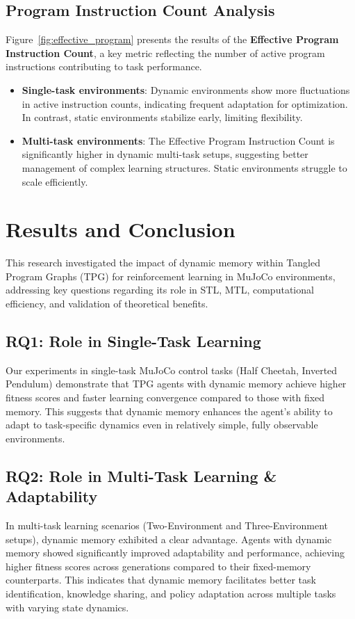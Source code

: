 \documentclass[sigconf]{acmart}
\begin{document}
\subsection{Program Instruction Count Analysis}
Figure~\ref{fig:effective_program} presents the results of the \textbf{Effective Program Instruction Count}, a key metric reflecting the number of active 
program instructions contributing to task performance.

\begin{itemize}
  \item \textbf{Single-task environments}: Dynamic environments show more fluctuations in active instruction counts, indicating frequent adaptation for optimization. In contrast, static environments stabilize early, limiting flexibility.
  \item \textbf{Multi-task environments}: The Effective Program Instruction Count is significantly higher in dynamic multi-task setups, suggesting better management of complex learning structures. Static environments struggle to scale efficiently.
\end{itemize}

  
  



\section{Results and Conclusion}

This research investigated the impact of dynamic memory within Tangled Program Graphs (TPG) for 
reinforcement learning in MuJoCo environments, addressing key questions regarding its role in 
STL, MTL, computational efficiency, and validation of theoretical benefits.

\subsection{RQ1: Role in Single-Task Learning} 
Our experiments in single-task MuJoCo control tasks (Half Cheetah, Inverted Pendulum) demonstrate 
that TPG agents with dynamic memory achieve higher fitness scores and faster learning convergence 
compared to those with fixed memory. This suggests that dynamic memory enhances the agent's ability 
to adapt to task-specific dynamics even in relatively simple, fully observable environments.

\subsection{RQ2: Role in Multi-Task Learning \& Adaptability} 
In multi-task learning scenarios (Two-Environment and Three-Environment setups), dynamic memory exhibited a clear advantage. 
Agents with dynamic memory showed significantly improved adaptability and performance, achieving 
higher fitness scores across generations compared to their fixed-memory counterparts. This indicates 
that dynamic memory facilitates better task identification, knowledge sharing, and policy adaptation 
across multiple tasks with varying state dynamics.
\end{document}
